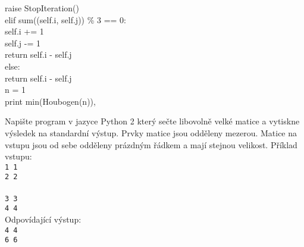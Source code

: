 \documentclass[addpoints,12pt]{exam}
\begin{document}
\begin{questions}
{\hspace*{0.6cm}\hspace*{0.6cm}\hspace*{0.6cm}raise StopIteration()\\
\hspace*{0.6cm}\hspace*{0.6cm}elif sum((self.i, self.j)) \%{} 3 == 0:\\
\hspace*{0.6cm}\hspace*{0.6cm}\hspace*{0.6cm}self.i += 1\\
\hspace*{0.6cm}\hspace*{0.6cm}\hspace*{0.6cm}self.j -= 1\\
\hspace*{0.6cm}\hspace*{0.6cm}\hspace*{0.6cm}return self.i - self.j\\
\hspace*{0.6cm}\hspace*{0.6cm}else:\\
\hspace*{0.6cm}\hspace*{0.6cm}\hspace*{0.6cm}return self.i - self.j\\
n = 1\\
print min(Houbogen(n)),}
\nopagebreak
\begin{choices}
\end{choices}
\question[2]
Napište program v jazyce Python 2 který sečte libovolně velké matice a vytiskne výsledek na standardní výstup. Prvky matice jsou odděleny mezerou. Matice na vstupu jsou od sebe odděleny prázdným řádkem a mají stejnou velikost. Příklad vstupu:\\
\texttt{1 1\\
2 2\\
\\
3 3\\
4 4}\\
Odpovídající výstup:\\
\texttt{4 4\\
6 6}\\


\end{questions}
\end{document}
